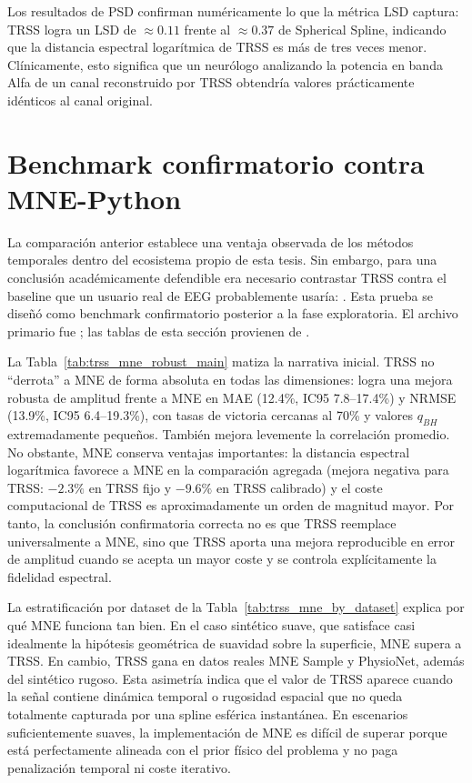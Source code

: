 Los resultados de PSD confirman numéricamente lo que la métrica LSD captura: TRSS logra un LSD de $\approx 0.11$ frente al $\approx 0.37$ de Spherical Spline, indicando que la distancia espectral logarítmica de TRSS es más de tres veces menor. Clínicamente, esto significa que un neurólogo analizando la potencia en banda Alfa de un canal reconstruido por TRSS obtendría valores prácticamente idénticos al canal original.

\section{Benchmark confirmatorio contra MNE-Python}
\label{sec:resultados_mne_confirmatorio}

La comparación anterior establece una ventaja observada de los métodos temporales dentro del ecosistema propio de esta tesis. Sin embargo, para una conclusión académicamente defendible era necesario contrastar TRSS contra el baseline que un usuario real de EEG probablemente usaría: . Esta prueba se diseñó como benchmark confirmatorio posterior a la fase exploratoria. El archivo primario fue ; las tablas de esta sección provienen de .



La Tabla~\ref{tab:trss_mne_robust_main} matiza la narrativa inicial. TRSS no ``derrota'' a MNE de forma absoluta en todas las dimensiones: logra una mejora robusta de amplitud frente a MNE en MAE (12.4\%, IC95 7.8--17.4\%) y NRMSE (13.9\%, IC95 6.4--19.3\%), con tasas de victoria cercanas al 70\% y valores $q_{BH}$ extremadamente pequeños. También mejora levemente la correlación promedio. No obstante, MNE conserva ventajas importantes: la distancia espectral logarítmica favorece a MNE en la comparación agregada (mejora negativa para TRSS: $-2.3\%$ en TRSS fijo y $-9.6\%$ en TRSS calibrado) y el coste computacional de TRSS es aproximadamente un orden de magnitud mayor. Por tanto, la conclusión confirmatoria correcta no es que TRSS reemplace universalmente a MNE, sino que TRSS aporta una mejora reproducible en error de amplitud cuando se acepta un mayor coste y se controla explícitamente la fidelidad espectral.



La estratificación por dataset de la Tabla~\ref{tab:trss_mne_by_dataset} explica por qué MNE funciona tan bien. En el caso sintético suave, que satisface casi idealmente la hipótesis geométrica de suavidad sobre la superficie, MNE supera a TRSS. En cambio, TRSS gana en datos reales MNE Sample y PhysioNet, además del sintético rugoso. Esta asimetría indica que el valor de TRSS aparece cuando la señal contiene dinámica temporal o rugosidad espacial que no queda totalmente capturada por una spline esférica instantánea. En escenarios suficientemente suaves, la implementación de MNE es difícil de superar porque está perfectamente alineada con el prior físico del problema y no paga penalización temporal ni coste iterativo.

